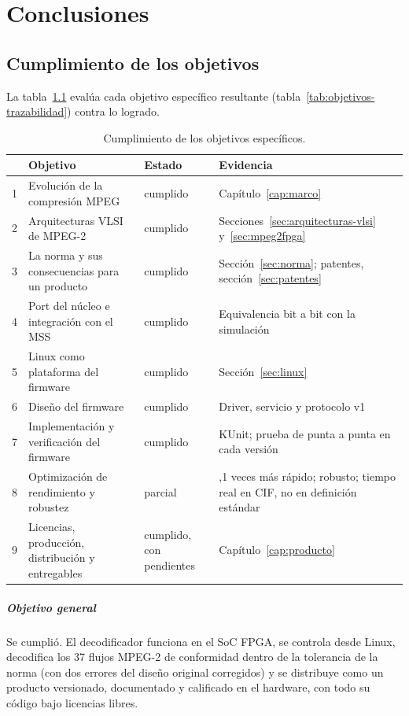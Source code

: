 \chapter{Conclusiones}
\label{cap:conclusiones}

\section{Cumplimiento de los objetivos}

La tabla~\ref{tab:cumplimiento} evalúa cada objetivo específico resultante
(tabla~\ref{tab:objetivos-trazabilidad}) contra lo logrado.

\begin{table}[ht]
  \centering\small
  \begin{tabularx}{\linewidth}{@{}l >{\raggedright}X l >{\raggedright\arraybackslash}X@{}}
    \toprule
    & \textbf{Objetivo} & \textbf{Estado} & \textbf{Evidencia} \\
    \midrule
    1 & Evolución de la compresión MPEG & cumplido & Capítulo~\ref{cap:marco} \\
    2 & Arquitecturas VLSI de MPEG-2 & cumplido & Secciones~\ref{sec:arquitecturas-vlsi} y~\ref{sec:mpeg2fpga} \\
    3 & La norma y sus consecuencias para un producto & cumplido & Sección~\ref{sec:norma}; patentes, sección~\ref{sec:patentes} \\
    4 & Port del núcleo e integración con el MSS & cumplido & Equivalencia bit a bit con la simulación \\
    5 & Linux como plataforma del firmware & cumplido & Sección~\ref{sec:linux} \\
    6 & Diseño del firmware & cumplido & Driver, servicio y protocolo v1 \\
    7 & Implementación y verificación del firmware & cumplido & KUnit; prueba de punta a punta en cada versión \\
    8 & Optimización de rendimiento y robustez & parcial & 3,1 veces más rápido; robusto; tiempo real en CIF, no en definición estándar \\
    9 & Licencias, producción, distribución y entregables & cumplido, con pendientes & Capítulo~\ref{cap:producto} \\
    \bottomrule
  \end{tabularx}
  \caption{Cumplimiento de los objetivos específicos.}
  \label{tab:cumplimiento}
\end{table}

\paragraph{Objetivo general}
Se cumplió. El decodificador funciona en el SoC FPGA, se controla desde
Linux, decodifica los 37 flujos MPEG-2 de conformidad dentro de la
tolerancia de la norma (con dos errores del diseño original corregidos) y se
distribuye como
un producto versionado, documentado y calificado en el hardware, con todo su
código bajo licencias libres.

